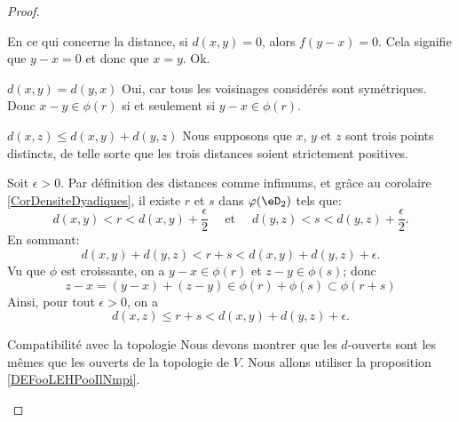 \begin{proof}
\begin{subproof}
    En ce qui concerne la distance, si \( d(x,y)=0\), alors \( f(y-x)=0\). Cela signifie que \( y-x=0\) et donc que \( x=y\). Ok.
        
    \item[$d(x,y) = d(y,x)$] Oui, car tous les voisinages considérés sont symétriques. Donc \( x-y\in \phi(r)\) si et seulement si \( y-x\in \phi(r)\).

    \item[$d(x,z) \leq d(x,y) + d(y,z)$] Nous supposons que \( x\), \( y\) et \( z\) sont trois points distincts, de telle sorte que les trois distances soient strictement positives.

        Soit \(\epsilon > 0 \). Par définition des distances comme infimums, et grâce au corolaire \ref{CorDensiteDyadiques}, il existe \(r\) et \(s\) dans \( \varphi(\eD_2) \) tels que:
    \begin{equation}
        d(x,y) < r < d(x,y) + \frac \epsilon 2 \quad\text{ et }\quad d(y,z) < s < d(y,z) + \frac \epsilon 2 .
    \end{equation}
    En sommant: 
    \begin{equation}
        d(x,y) + d(y,z) <  r + s < d(x,y)+d(y,z)+\epsilon.
    \end{equation}
    Vu que \( \phi\) est croissante, on a \(y - x \in \phi(r)\) et \(z - y \in \phi(s)\); donc
    \begin{equation}
       z-x = (y - x) + (z - y) \in \phi(r) + \phi(s) \subset \phi(r+s)
    \end{equation}
    Ainsi, pour tout \(\epsilon > 0 \), on a
    \begin{equation}
        d(x,z) \leq r+s < d(x,y) + d(y,z) + \epsilon.
    \end{equation}

    \item[Compatibilité avec la topologie]
        Nous devons montrer que les \( d\)-ouverts sont les mêmes que les ouverts de la topologie de \( V\). Nous allons utiliser la proposition \ref{DEFooLEHPooIlNmpi}.


\end{subproof}
\end{proof}
